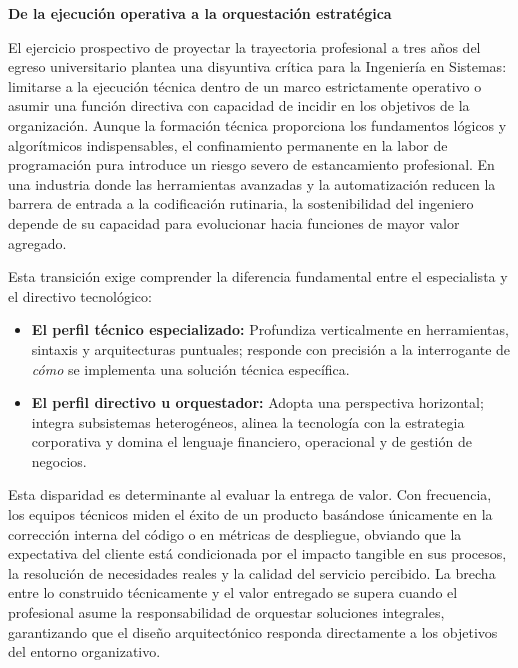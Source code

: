 \par\textbf{\textcolor{unabblue}{\faChessBoard}\quad De la ejecución operativa a la orquestación estratégica}\par
El ejercicio prospectivo de proyectar la trayectoria profesional a tres años del egreso universitario plantea una disyuntiva crítica para la Ingeniería en Sistemas: limitarse a la ejecución técnica dentro de un marco estrictamente operativo o asumir una función directiva con capacidad de incidir en los objetivos de la organización. Aunque la formación técnica proporciona los fundamentos lógicos y algorítmicos indispensables, el confinamiento permanente en la labor de programación pura introduce un riesgo severo de estancamiento profesional. En una industria donde las herramientas avanzadas y la automatización reducen la barrera de entrada a la codificación rutinaria, la sostenibilidad del ingeniero depende de su capacidad para evolucionar hacia funciones de mayor valor agregado.

Esta transición exige comprender la diferencia fundamental entre el especialista y el directivo tecnológico:
\begin{itemize}
  \item \textbf{El perfil técnico especializado:} Profundiza verticalmente en herramientas, sintaxis y arquitecturas puntuales; responde con precisión a la interrogante de \textit{cómo} se implementa una solución técnica específica.
  \item \textbf{El perfil directivo u orquestador:} Adopta una perspectiva horizontal; integra subsistemas heterogéneos, alinea la tecnología con la estrategia corporativa y domina el lenguaje financiero, operacional y de gestión de negocios.
\end{itemize}

Esta disparidad es determinante al evaluar la entrega de valor. Con frecuencia, los equipos técnicos miden el éxito de un producto basándose únicamente en la corrección interna del código o en métricas de despliegue, obviando que la expectativa del cliente está condicionada por el impacto tangible en sus procesos, la resolución de necesidades reales y la calidad del servicio percibido. La brecha entre lo construido técnicamente y el valor entregado se supera cuando el profesional asume la responsabilidad de orquestar soluciones integrales, garantizando que el diseño arquitectónico responda directamente a los objetivos del entorno organizativo.

